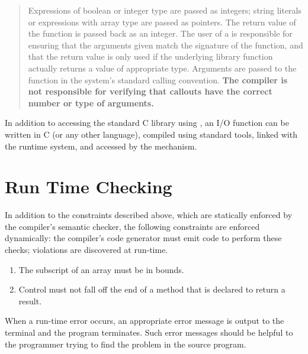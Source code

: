 \begin{quotation}
Expressions of boolean or integer type are passed as integers;
string literals or expressions with array type are passed as
pointers. The return value of the function is passed back as an
integer. The user of a  is responsible for ensuring that the
arguments given match the signature of the function, and that the return
value is only used if the underlying library function actually returns a
value of appropriate type. Arguments are passed to the function in the
system's standard calling convention. \textbf{The compiler is not responsible for verifying that callouts have the
correct number or type of arguments.}
\end{quotation}

In addition to accessing the standard C library using , an
I/O function can be written in C (or any other language), compiled using
standard tools, linked with the runtime system, and accessed by the
 mechanism.



\section*{Run Time Checking}

In addition to the constraints described above, which are statically
enforced by the compiler's semantic checker, the following constraints
are enforced dynamically: the compiler's code generator must emit
code to perform these checks; violations are discovered at run-time.

\begin{enumerate}
\item The subscript of an array must be in bounds.
\item Control must not fall off the end of a method that is declared to
      return a result.
\end{enumerate}

When a run-time error occurs, an appropriate error message is output to
the terminal and the program terminates.  Such error messages should be
helpful to the programmer trying to find the problem in the source
program.


